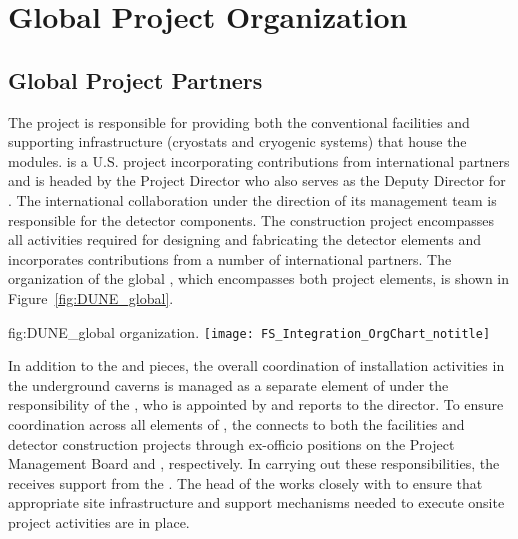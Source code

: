 \chapter{Global Project Organization}
\label{vl:tc-global}

\section{Global Project Partners}
\label{sec:partners}

The  project is responsible for providing both the
conventional facilities and supporting infrastructure (cryostats and
cryogenic systems) that house the  
modules.  is a U.S.  project incorporating
contributions from international partners and is headed by the
 Project Director who also serves as the 
Deputy Director for .  The international 
collaboration under the direction of its management team is
responsible for the detector components.  The  
construction project encompasses all activities required for designing
and fabricating the detector elements and incorporates contributions
from a number of international partners.  The organization of the
global , which encompasses both project elements, is
shown in Figure~\ref{fig:DUNE_global}.
\begin{dunefigure}{fig:DUNE_global}
  { organization.}
  \texttt{[image: FS\_Integration\_OrgChart\_notitle]}
\end{dunefigure}

In addition to the  and  pieces, the overall
coordination of installation activities in the underground caverns 
is managed as a separate element of  under the
responsibility of the , who is appointed by and reports
to the  director.  To ensure coordination across
all elements of , the  connects to both
the facilities and detector construction projects through ex-officio
positions on the  Project Management Board and
 , respectively.  In carrying out these
responsibilities, the  receives support from the .  
The head of the  works closely with  to 
ensure that appropriate site infrastructure and support mechanisms 
needed to execute onsite project activities are in place.

